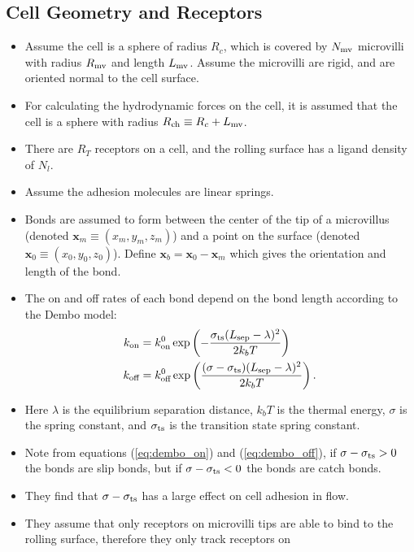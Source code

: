 \documentclass[
10pt, %
letterpaper, %
twocolumn, %
landscape %
]{article}
\newcommand{\mv}{\textnormal{mv}}
\newcommand{\ch}{\textnormal{ch}}
\newcommand{\x}{\mathbf{x}}
\newcommand{\on}{\textnormal{on}}
\newcommand{\off}{\textnormal{off}}
\newcommand{\ts}{\textnormal{ts}}
\newcommand{\sep}{\textnormal{sep}}
\begin{document}
\subsection{Cell Geometry and Receptors}
\label{sec:cell-geom-recept}


\begin{itemize}
\item Assume the cell is a sphere of radius $R_c$, which is covered by
  $N_\mv$ microvilli with radius $R_\mv$ and length $L_\mv$. Assume
  the microvilli are rigid, and are oriented normal to the cell
  surface. 
\item For calculating the hydrodynamic forces on the cell, it is
  assumed that the cell is a sphere with radius $R_\ch \equiv R_c +
  L_\mv$. 
\item There are $R_T$ receptors on a cell, and the rolling surface
  has a ligand density of $N_l$.
\item Assume the adhesion molecules are linear springs.
\item Bonds are assumed to form between the center of the tip of a
  microvillus (denoted $\x_m \equiv (x_m, y_m, z_m)$) and a point on
  the surface (denoted $\x_0 \equiv (x_0, y_0, z_0)$). Define $\x_b =
  \x_0 - \x_m$ which gives the orientation and length of the bond.
\item The on and off rates of each bond depend on the bond length
  according to the Dembo model: 
\begin{align}
  k_\on &= k_\on^0 \exp\left(- \frac{\sigma_\ts
                (L_\sep - \lambda)^2}{2k_b
          T}\right) \label{eq:dembo_on} \\ 
  k_\off &= k_\off^0 \exp\left(\frac{(\sigma -
                 \sigma_\ts)(L_\sep - \lambda)^2}{2k_b
                 T}\right). \label{eq:dembo_off}
\end{align}
\item Here $\lambda$ is the equilibrium separation distance, $k_b T$
  is the thermal energy, $\sigma$ is the spring constant, and
  $\sigma_\ts$ is the transition state spring constant.
\item Note from equations (\ref{eq:dembo_on}) and
  (\ref{eq:dembo_off}), if $\sigma - \sigma_\ts > 0$ the bonds are
  slip bonds, but if $\sigma - \sigma_\ts < 0$ the bonds are catch
  bonds.
\item They find that $\sigma - \sigma_\ts$ has a large effect on
  cell adhesion in flow.
\item They assume that only receptors on microvilli tips are able to
  bind to the rolling surface, therefore they only track receptors on

\end{itemize}
\end{document}
